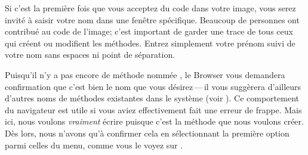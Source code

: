\documentclass[a4paper,10pt,twoside]{book}
\begin{document}
Si c'est la première fois que vous acceptez du code dans
votre image, vous serez invité à saisir votre nom dans une
fenêtre spécifique. Beaucoup de personnes ont contribué au code de
l'image; c'est important de garder une trace de tous ceux qui créent
ou modifient les méthodes. Entrez simplement votre prénom suivi de
votre nom sans espaces ni point de séparation.


Puisqu'il n'y a pas encore de méthode nommée \mbox{,} le 
Browser vous demandera confirmation que c'est bien le nom que vous
désirez\,---\,il vous suggèrera d'ailleurs d'autres noms de
méthodes existantes dans le système (voir ).
Ce comportement du navigateur est utile si vous aviez effectivement
fait une erreur de frappe. Mais ici, nous voulons \emph{vraiment}
écrire \mbox{} puisque c'est la méthode que nous voulons
créer. Dès lors, nous n'avons qu'à confirmer cela en
sélectionnant la première option parmi celles du menu, comme vous
le voyez sur . 

\end{document}
